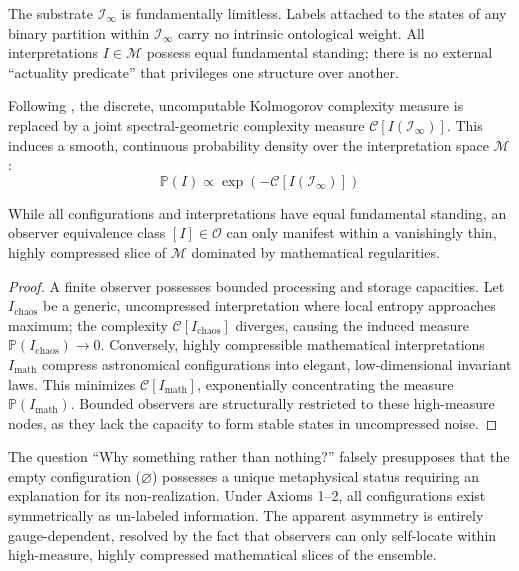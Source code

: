 \documentclass[11pt]{article}
\begin{document}
\begin{axiom}
The substrate $\mathcal{I}_\infty$ is fundamentally limitless. Labels attached to the states of any binary partition within $\mathcal{I}_\infty$ carry no intrinsic ontological weight. All interpretations $I \in \mathcal{M}$ possess equal fundamental standing; there is no external ``actuality predicate'' that privileges one structure over another.
\end{axiom}

\begin{axiom}
Following \cite{meskanen2020}, the discrete, uncomputable Kolmogorov complexity measure is replaced by a joint spectral-geometric complexity measure $\mathcal{C}[I(\mathcal{I}_\infty)]$. This induces a smooth, continuous probability density over the interpretation space $\mathcal{M}$:
\begin{equation}
\mathbb{P}(I) \propto \exp\left(-\mathcal{C}[I(\mathcal{I}_\infty)]\right)
\end{equation}
\end{axiom}

\begin{theorem}
While all configurations and interpretations have equal fundamental standing, an observer equivalence class $[I] \in \mathcal{O}$ can only manifest within a vanishingly thin, highly compressed slice of $\mathcal{M}$ dominated by mathematical regularities.
\end{theorem}

\begin{proof}
A finite observer possesses bounded processing and storage capacities. Let $I_{\text{chaos}}$ be a generic, uncompressed interpretation where local entropy approaches maximum; the complexity $\mathcal{C}[I_{\text{chaos}}]$ diverges, causing the induced measure $\mathbb{P}(I_{\text{chaos}}) \to 0$. Conversely, highly compressible mathematical interpretations $I_{\text{math}}$ compress astronomical configurations into elegant, low-dimensional invariant laws. This minimizes $\mathcal{C}[I_{\text{math}}]$, exponentially concentrating the measure $\mathbb{P}(I_{\text{math}})$. Bounded observers are structurally restricted to these high-measure nodes, as they lack the capacity to form stable states in uncompressed noise.
\end{proof}

\begin{corollary}
The question ``Why something rather than nothing?'' falsely presupposes that the empty configuration ($\varnothing$) possesses a unique metaphysical status requiring an explanation for its non-realization. Under Axioms 1--2, all configurations exist symmetrically as un-labeled information. The apparent asymmetry is entirely gauge-dependent, resolved by the fact that observers can only self-locate within high-measure, highly compressed mathematical slices of the ensemble.
\end{corollary}
\end{document}

